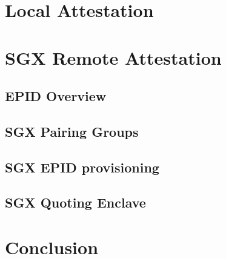 \documentclass[11pt]{article}
\begin{document}
  \section{Local Attestation}
  \label{sec:localatt}

  \section{SGX Remote Attestation}
  \label{sec:remoteatt}

  \subsection{EPID Overview}
  \label{ssec:epid}

  \subsection{SGX Pairing Groups}
  \label{ssec:pairings}

  \subsection{SGX EPID provisioning}
  \label{ssec:epidprov}

  \subsection{SGX Quoting Enclave}
  \label{ssec:qe}

  \section{Conclusion}
  \label{sec:conclusion}



\end{document}
